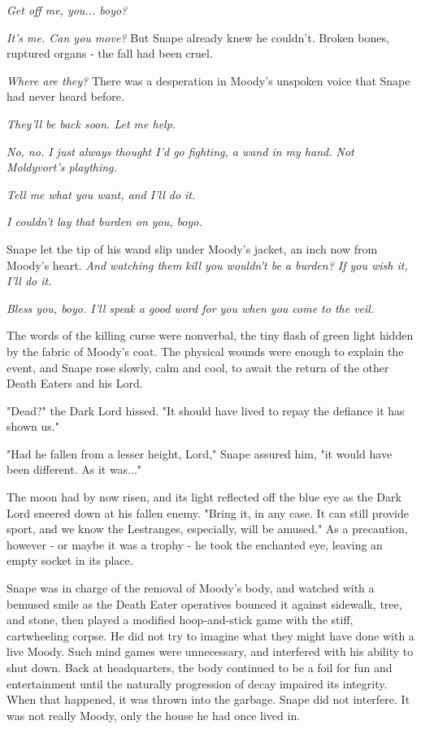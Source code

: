 \emph{Get off me, you... boyo?}

\emph{It's me. Can you move?} But Snape already knew he couldn't. Broken bones, ruptured organs - the fall had been cruel.

\emph{Where are they?} There was a desperation in Moody's unspoken voice that Snape had never heard before.

\emph{They'll be back soon. Let me help.}

\emph{No, no. I just always thought I'd go fighting, a wand in my hand. Not Moldyvort's plaything.}

\emph{Tell me what you want, and I'll do it.}

\emph{I couldn't lay that burden on you, boyo.}

Snape let the tip of his wand slip under Moody's jacket, an inch now from Moody's heart. \emph{And watching them kill you wouldn't be a burden? If you wish it, I'll do it.}

\emph{Bless you, boyo. I'll speak a good word for you when you come to the veil.}

The words of the killing curse were nonverbal, the tiny flash of green light hidden by the fabric of Moody's coat. The physical wounds were enough to explain the event, and Snape rose slowly, calm and cool, to await the return of the other Death Eaters and his Lord.

\sbreak

"Dead?" the Dark Lord hissed. "It should have lived to repay the defiance it has shown us."

"Had he fallen from a lesser height, Lord," Snape assured him, "it would have been different. As it was..."

The moon had by now risen, and its light reflected off the blue eye as the Dark Lord sneered down at his fallen enemy. "Bring it, in any case. It can still provide sport, and we know the Lestranges, especially, will be amused." As a precaution, however - or maybe it was a trophy - he took the enchanted eye, leaving an empty socket in its place.

Snape was in charge of the removal of Moody's body, and watched with a bemused smile as the Death Eater operatives bounced it against sidewalk, tree, and stone, then played a modified hoop-and-stick game with the stiff, cartwheeling corpse. He did not try to imagine what they might have done with a live Moody. Such mind games were unnecessary, and interfered with his ability to shut down. Back at headquarters, the body continued to be a foil for fun and entertainment until the naturally progression of decay impaired its integrity. When that happened, it was thrown into the garbage. Snape did not interfere. It was not really Moody, only the house he had once lived in.

